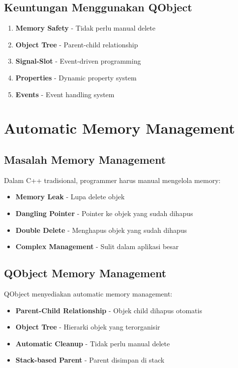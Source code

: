 \subsection{Keuntungan Menggunakan QObject}

\begin{enumerate}
\item \textbf{Memory Safety} - Tidak perlu manual delete
\item \textbf{Object Tree} - Parent-child relationship
\item \textbf{Signal-Slot} - Event-driven programming
\item \textbf{Properties} - Dynamic property system
\item \textbf{Events} - Event handling system
\end{enumerate}

\section{Automatic Memory Management}

\subsection{Masalah Memory Management}

Dalam C++ tradisional, programmer harus manual mengelola memory:
\begin{itemize}
\item \textbf{Memory Leak} - Lupa delete objek
\item \textbf{Dangling Pointer} - Pointer ke objek yang sudah dihapus
\item \textbf{Double Delete} - Menghapus objek yang sudah dihapus
\item \textbf{Complex Management} - Sulit dalam aplikasi besar
\end{itemize}

\subsection{QObject Memory Management}

QObject menyediakan automatic memory management:

\begin{itemize}
\item \textbf{Parent-Child Relationship} - Objek child dihapus otomatis
\item \textbf{Object Tree} - Hierarki objek yang terorganisir
\item \textbf{Automatic Cleanup} - Tidak perlu manual delete
\item \textbf{Stack-based Parent} - Parent disimpan di stack
\end{itemize}

